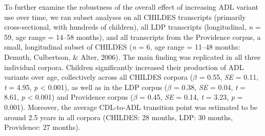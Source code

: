 \documentclass[10pt, letterpaper]{article}
\begin{document}
To further examine the robustness of the overall effect of increasing
ADL variant use over time, we ran subset analyses on all CHILDES
transcripts (primarily cross-sectional, with hundreds of children), all
LDP transcripts (longitudinal, \emph{n} = 59, age range = 14--58
months), and all transcripts from the Providence corpus, a small,
longitudinal subset of CHILDES (\emph{n} = 6, age range = 11--48 months:
Demuth, Culbertson, \& Alter, 2006). The main finding was replicated in
all three individual corpora. Children significantly increased their
production of ADL variants over age, collectively across all CHILDES
corpora (\(\beta\) = 0.55, \emph{SE} = 0.11, \emph{t} = 4.95, \emph{p}
\textless{} 0.001), as well as in the LDP corpus (\(\beta\) = 0.38,
\emph{SE} = 0.04, \emph{t} = 8.61, \emph{p} \textless{} 0.001) and
Providence corpus (\(\beta\) = 0.45, \emph{SE} = 0.14, \emph{t} = 3.23,
\emph{p} = 0.001). Moreover, the average CDL-to-ADL transition point was
estimated to be around 2.5 years in all corpora (CHILDES: 28 months,
LDP: 30 months, Providence: 27 months).
\end{document}
